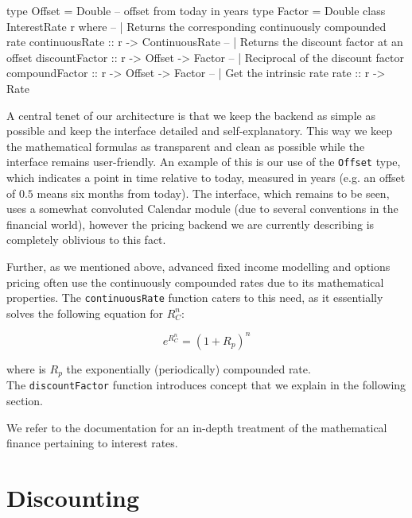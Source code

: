 
\begin{hscode}
type Offset = Double -- offset from today in years
type Factor = Double
class InterestRate r where
  -- | Returns the corresponding continuously compounded rate
  continuousRate :: r -> ContinuousRate
  -- | Returns the discount factor at an offset
  discountFactor :: r -> Offset -> Factor 
  -- | Reciprocal of the discount factor
  compoundFactor :: r -> Offset -> Factor 
  -- | Get the intrinsic rate
  rate           :: r -> Rate
\end{hscode}

A central tenet of our architecture is that we keep the backend
as simple as possible and keep the interface detailed and 
self-explanatory. This way we keep the mathematical formulas as transparent
and clean as possible while the interface remains user-friendly. An example
of this is our use of the \texttt{Offset} type, which indicates a point in 
time relative to today, measured in years (e.g. an offset of $0.5$
means six months from today). The interface, which remains to be seen, uses
a somewhat convoluted Calendar module (due to several conventions in the 
financial world), however the pricing backend we are currently describing 
is completely oblivious to this fact.

Further, as we mentioned above, advanced fixed income modelling and options 
pricing often use the continuously compounded rates due to its mathematical 
properties\cite{HULL}. The \texttt{continuousRate} function caters to this
need, as it essentially solves the following equation for $R_C^n$:

\begin{equation}
e^{R_C^n} = (1+R_p)^n
\end{equation}

where is $R_p$ the exponentially (periodically) compounded rate.\\

The \texttt{discountFactor} function introduces concept that we
explain in the following section.

We refer to the \hql documentation\cite{hqldoc} for an in-depth treatment of the
mathematical finance pertaining to interest rates.

\section{Discounting}\label{sec:discounting}

